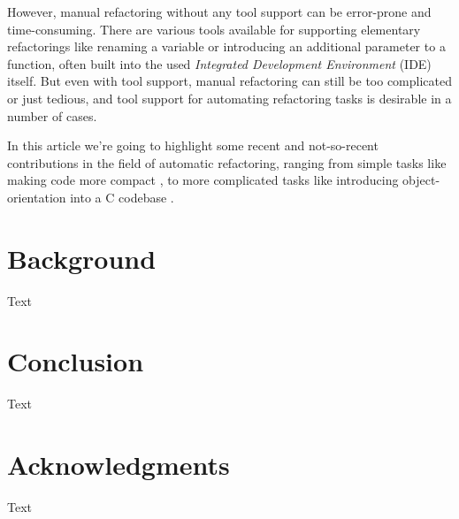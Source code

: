 \documentclass[conference,compsoc,a4paper]{IEEEtran}
\begin{document}
However, manual refactoring without any tool support can be error-prone and time-consuming. There are various tools 
available for supporting elementary refactorings like renaming a variable or introducing an additional parameter to a 
function, often built into the used \emph{Integrated Development Environment} (IDE) itself. But even with tool support, 
manual refactoring can still be too complicated or just tedious, and tool support for automating refactoring tasks is 
desirable in a number of cases.

In this article we're going to highlight some recent and not-so-recent contributions in the field of automatic 
refactoring, ranging from simple tasks like making code more compact \cite{sparta}, to more complicated tasks like 
introducing object-orientation into a C codebase \cite{cpp}.


\section{Background}

Text


\section{Conclusion}

Text


\section*{Acknowledgments}

Text






\end{document}
